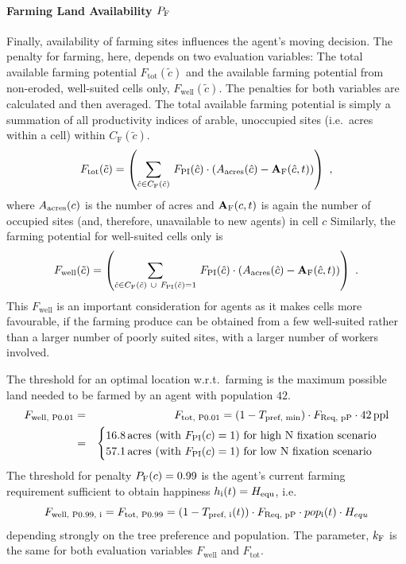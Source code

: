 \paragraph{Farming Land Availability $P_{\rm F}$}
Finally, availability of farming sites influences the agent's moving decision.
The penalty for farming, here, depends on two evaluation variables: 
The total available farming potential $F_\text{tot}(\tilde{c})$ and the available farming potential from non-eroded, well-suited cells only, $F_\text{well}(\tilde{c})$.
The penalties for both variables are calculated and then averaged.
The total available farming potential is simply a summation of all productivity indices of arable, unoccupied sites (i.e.\ acres within a cell) within $C_\text{F}(\tilde{c})$.
\begin{equation}
	F_\text{tot}(\tilde{c}) = \left( \sum_{\hat{c} \in C_{\rm F}(\tilde{c}) }\, F_{\rm PI}(\hat{c}) \cdot (A_{\rm acres}(\hat{c})  - \mathbf{A}_{\rm F}(\hat{c}, t) )\right) \ ,
\end{equation}
where $A_{\rm acres}(c)$ is the number of acres and $ \mathbf{A}_{\rm F}(c,t)$ is again the number of occupied sites (and, therefore, unavailable to new agents) in cell $c$ 
Similarly, the farming potential for well-suited cells only is 
\begin{equation}
	F_\text{well}(\tilde{c}) = \left( \sum_{\hat{c} \in C_{\rm F}(\tilde{c}) \ \cup \ F_{\rm PI}(\hat{c})=1} \, F_{\rm PI}(\hat{c}) \cdot (A_{\rm acres}(\hat{c})  - \mathbf{A}_{\rm F}(\hat{c},t) )\right) \ .
\end{equation}
This $F_\text{well}$ is an important consideration for agents as it makes cells more favourable, if the farming produce can be obtained from a few well-suited rather than a larger number of poorly suited sites, with a larger number of workers involved.

The threshold for an optimal location w.r.t.\ farming is the maximum possible land needed to be farmed by an agent with population $42$.
\begin{eqnarray}
F_\text{well, P0.01} & = & F_\text{tot, P0.01} =  (1-T_\text{pref, min})\cdot F_\text{Req, pP} \cdot 42\, {\rm ppl}  \\
& = & 
\begin{cases} 16.8\, {\rm acres}  \text{ (with }F_{\rm PI}(c)=1\text{) for high N fixation scenario} \\  57.1 \, {\rm acres} \text{ (with }F_{\rm PI}(c)=1\text{) for low N fixation scenario} \nonumber
\end{cases} 
\end{eqnarray}
The threshold for penalty $P_{\rm F}(c)=0.99$ is the agent's current farming requirement sufficient to obtain happiness $h_{\rm i}(t) = H_{\rm equ}$, i.e.\
\begin{equation} 
F_\text{well, P0.99, i} = F_\text{tot, P0.99} = (1-T_\text{pref, i}(t))\cdot F_\text{Req, pP}\cdot pop_{\rm i}(t) \cdot H_{equ}
\end{equation}
depending strongly on the tree preference and population.
The parameter, $k_{\rm F}$ is the same for both evaluation variables $F_\text{well} $ and $F_\text{tot}$.

